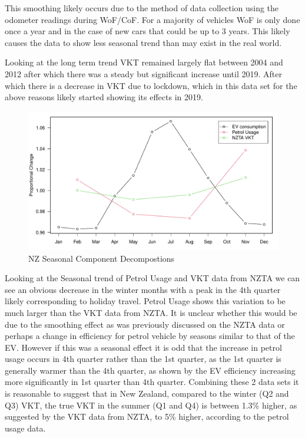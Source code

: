 \documentclass[
]{article}
\begin{document}
This smoothing likely occurs due to the method of data collection using
the odometer readings during WoF/CoF. For a majority of vehicles WoF is
only done once a year and in the case of new cars that could be up to 3
years. This likely causes the data to show less seasonal trend than may
exist in the real world.

Looking at the long term trend VKT remained largely flat between 2004
and 2012 after which there was a steady but significant increase until
2019. After which there is a decrease in VKT due to lockdown, which in
this data set for the above reasons likely started showing its effects
in 2019.

\begin{figure}
\centering
\includegraphics{summary_week4_files/figure-latex/petrol_VKT_vs_eff-1.pdf}
\caption{NZ Seasonal Component Decompostions}
\end{figure}

Looking at the Seasonal trend of Petrol Usage and VKT data from NZTA we
can see an obvious decrease in the winter months with a peak in the 4th
quarter likely corresponding to holiday travel. Petrol Usage shows this
variation to be much larger than the VKT data from NZTA. It is unclear
whether this would be due to the smoothing effect as was previously
discussed on the NZTA data or perhaps a change in efficiency for petrol
vehicle by seasons similar to that of the EV. However if this was a
seasonal effect it is odd that the increase in petrol usage occurs in
4th quarter rather than the 1st quarter, as the 1st quarter is generally
warmer than the 4th quarter, as shown by the EV efficiency increasing
more significantly in 1st quarter than 4th quarter. Combining these 2
data sets it is reasonable to suggest that in New Zealand, compared to
the winter (Q2 and Q3) VKT, the true VKT in the summer (Q1 and Q4) is
between 1.3\% higher, as suggested by the VKT data from NZTA, to 5\%
higher, according to the petrol usage data.
\end{document}
